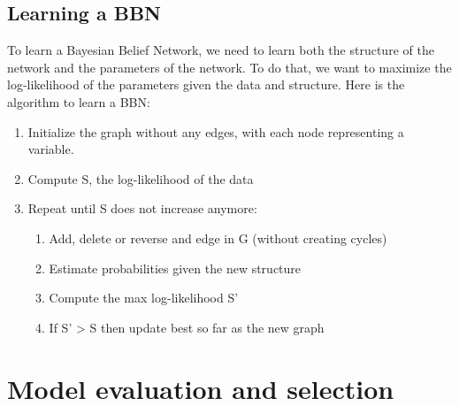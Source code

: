 \documentclass[12pt, openany]{report}
\theoremstyle{definition}
\begin{document}
\subsection{Learning a BBN} 
To learn a Bayesian Belief Network, we need to learn both the structure of the network and the parameters of the network. To do that, we want to maximize the log-likelihood of the parameters given the data and structure. Here is the algorithm to learn a BBN:
\begin{enumerate}
    \item Initialize the graph without any edges, with each node representing a variable.
    \item Compute S, the log-likelihood of the data
    \item Repeat until S does not increase anymore:
    \begin{enumerate}
        \item Add, delete or reverse and edge in G (without creating cycles)
        \item Estimate probabilities given the new structure
        \item Compute the max log-likelihood S’
        \item If S' > S then update best so far as the new graph
    \end{enumerate}
\end{enumerate}
\section{Model evaluation and selection}
\end{document}
